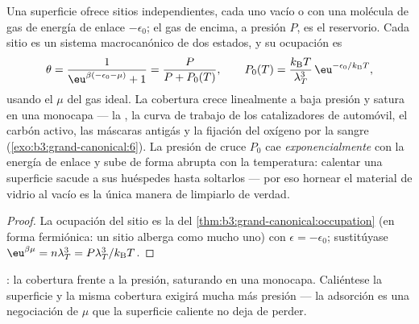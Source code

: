 \begin{proposition}\label{prop:b3:grand-canonical:langmuir}
Una superficie ofrece sitios independientes, cada uno vacío o con una
molécula de gas de energía de enlace $-\epsilon_0$; el gas de encima, a
presión $P$, es el reservorio. Cada sitio es un sistema macrocanónico de dos
estados, y su ocupación es
\[
\theta = \frac{1}{\eu^{\beta(-\epsilon_0 - \mu)} + 1}
 = \frac{P}{P + P_0(T)} , \qquad
P_0(T) = \frac{k_{\text{B}}T}{\lambda_T^3}\,
\eu^{-\epsilon_0/k_{\text{B}}T} ,
\]
usando el $\mu$ del gas ideal. La cobertura crece linealmente a baja
presión y satura en una monocapa --- la \emph{}, la
curva de trabajo de los catalizadores de automóvil, el carbón activo, las
máscaras antigás y la fijación del oxígeno por la sangre
(\cref{exo:b3:grand-canonical:6}). La presión de cruce $P_0$
cae \emph{exponencialmente} con la energía de enlace y sube de forma abrupta
con la temperatura: calentar una superficie sacude a sus huéspedes hasta
soltarlos --- por eso hornear el material de vidrio al vacío es la única
manera de limpiarlo de verdad.
\end{proposition}

\begin{proof}
La ocupación del sitio es la del
\cref{thm:b3:grand-canonical:occupation} (en forma fermiónica: un sitio
alberga como mucho uno) con $\epsilon = -\epsilon_0$; sustitúyase
$\eu^{\beta\mu} = n\lambda_T^3 = P\lambda_T^3/k_{\text{B}}T$.
\end{proof}

\begin{omfigure}

{\small {}: la cobertura frente a la presión, saturando
en una monocapa. Caliéntese la superficie y la misma cobertura exigirá
mucha más presión --- la adsorción es una negociación de $\mu$ que la
superficie caliente no deja de perder.}
\end{omfigure}

